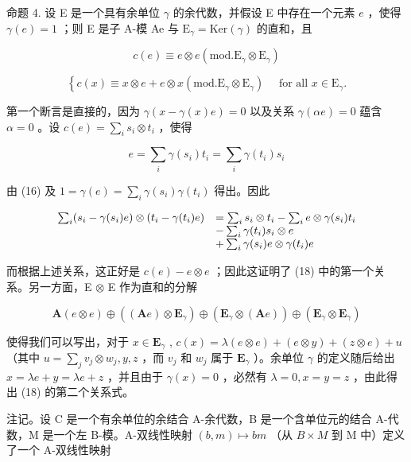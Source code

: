 命题 4. 设 E 是一个具有余单位 \(\gamma\) 的余代数，并假设 E 中存在一个元素 \(e\) ，使得 \(\gamma(e) = 1\) ；则 E 是子 A-模 Ae 与 \(\mathrm{E}_{\gamma} = \mathrm{Ker}(\gamma)\) 的直和，且

\[
c (e) \equiv e \otimes e (\mathrm{mod.} \mathrm{E} _ {\gamma} \otimes \mathrm{E} _ {\gamma})\tag{18}
\]

\[
\left\{c (x) \equiv x \otimes e + e \otimes x (\mathrm{mod.} \mathrm{E} _ {\gamma} \otimes \mathrm{E} _ {\gamma}) \quad \text { for all } x \in \mathrm{E} _ {\gamma}. \right.
\]

第一个断言是直接的，因为 \(\gamma(x - \gamma(x)e) = 0\) 以及关系 \(\gamma(\alpha e) = 0\) 蕴含 \(\alpha = 0\) 。设 \(c(e) = \sum_{i} s_i \otimes t_i\) ，使得

\[
e = \sum_ {i} \gamma (s _ {i}) t _ {i} = \sum_ {i} \gamma (t _ {i}) s _ {i}
\]

由 (16) 及 \(1 = \gamma(e) = \sum_{i} \gamma(s_i) \gamma(t_i)\) 得出。因此

\[
\begin{array}{r l} \sum_ {i} (s _ {i} - \gamma (s _ {i}) e) \otimes (t _ {i} - \gamma (t _ {i}) e) & = \sum_ {i} s _ {i} \otimes t _ {i} - \sum_ {i} e \otimes \gamma (s _ {i}) t _ {i} \\ & - \sum_ {i} \gamma (t _ {i}) s _ {i} \otimes e \\ & + \sum_ {i} \gamma (s _ {i}) e \otimes \gamma (t _ {i}) e \end{array}
\]

而根据上述关系，这正好是 \(c(e) - e \otimes e\) ；因此这证明了 (18) 中的第一个关系。另一方面，E \(\otimes\) E 作为直和的分解

\[
\mathbf {A} (e \otimes e) \oplus ((\mathbf {A} e) \otimes \mathbf {E} _ {\gamma}) \oplus (\mathbf {E} _ {\gamma} \otimes (\mathbf {A} e)) \oplus (\mathbf {E} _ {\gamma} \otimes \mathbf {E} _ {\gamma})
\]

使得我们可以写出，对于 \(x \in \mathbf{E}_{\gamma}\) , \(c(x) = \lambda(e \otimes e) + (e \otimes y) + (z \otimes e) + u\) （其中 \(u = \sum_{j} v_{j} \otimes w_{j}, y, z\) ，而 \(v_{j}\) 和 \(w_{j}\) 属于 \(\mathbf{E}_{\gamma}\) ）。余单位 \(\gamma\) 的定义随后给出 \(x = \lambda e + y = \lambda e + z\) ，并且由于 \(\gamma(x) = 0\) ，必然有 \(\lambda = 0, x = y = z\) ，由此得出 (18) 的第二个关系式。

注记。设 C 是一个有余单位的余结合 A-余代数，B 是一个含单位元的结合 A-代数，M 是一个左 B-模。A-双线性映射 \((b, m) \mapsto bm\) （从 \(B \times M\) 到 M 中）定义了一个 A-双线性映射

